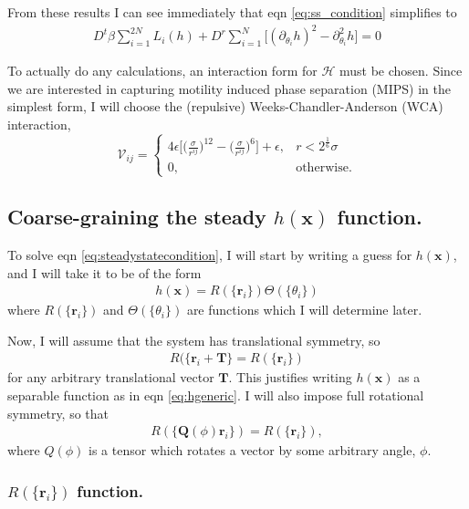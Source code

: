 \documentclass{article}
\begin{document}
From these results I can see immediately that eqn \ref{eq:ss_condition} simplifies to
\begin{align}\label{eq:steadystatecondition}
  D^t\beta\sum_{i=1}^{2N}L_i(h)+D^r\sum_{i=1}^{N}\big[(\partial_{\theta_i}h)^2
  -\partial_{\theta_i}^2h\big]=0
\end{align}

To actually do any calculations, an interaction form for $\mathcal{H}$ must be chosen. Since we
are interested in capturing motility induced phase separation (MIPS) in the simplest form, I
will choose the (repulsive) Weeks-Chandler-Anderson (WCA) interaction,
\begin{equation}
  \mathcal{V}_{ij} =
  \begin{cases}
    4\epsilon\bigg[\bigg(\frac{\sigma}{r^{ij}}\bigg)^{12}
    -\bigg(\frac{\sigma}{r^{ij}}\bigg)^6\bigg]+\epsilon, & r<2^{\frac{1}{6}}\sigma \\
    0, & \mathrm{otherwise}.
  \end{cases}
\end{equation}


\subsection{Coarse-graining the steady $h(\bm{x})$ function.}

To solve eqn \ref{eq:steadystatecondition}, I will start by writing a guess for $h(\bm{x})$, and I
will take it to be of the form
\begin{align}\label{eq:hgeneric}
  h(\bm{x})=R(\{\bm{r}_i\})\Theta(\{\theta_i\})
\end{align}
where $R(\{\bm{r}_i\})$ and $\Theta(\{\theta_i\})$ are functions which I will determine later.

Now, I will assume that the system has translational symmetry, so
\begin{align}\label{eq:Rtranssym}
  R(\{\bm{r}_i+\bm{T}\}=R(\{\bm{r}_i\})
\end{align}
for any arbitrary translational vector $\bm{T}$. This justifies writing $h(\bm{x})$ as a separable
function as in eqn \ref{eq:hgeneric}. I will also impose full rotational symmetry, so that
\begin{align}\label{eq:hrotsymm}
  R(\{\bm{Q}(\phi)\bm{r}_i\})=R(\{\bm{r}_i\}),
\end{align}
where $Q(\phi)$ is a tensor which rotates a vector by some arbitrary angle, $\phi$.

\subsubsection{$R(\{\bm{r}_i\})$ function.}
\end{document}
